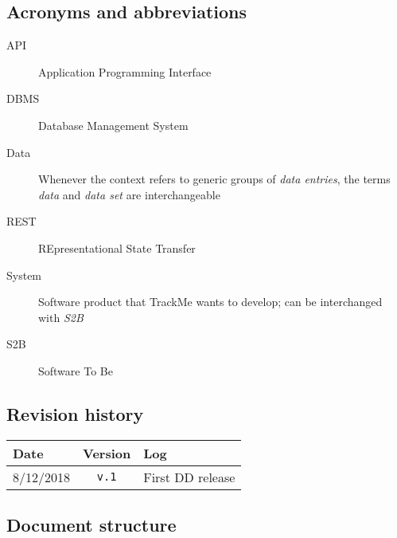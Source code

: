 \documentclass[../DD0.tex]{subfiles}
\newcommand{\addRevision}[3]{#1 & \texttt{v.#2} & #3 \\ \hline}
\begin{document}
  \subsection{Acronyms and abbreviations}
  \label{sec:acronyms}

    \begin{description}
      \item[API] Application Programming Interface

      \item[DBMS] Database Management System

      \item[Data] Whenever the context refers to generic groups of \textit{data entries}, the terms \textit{data} and \textit{data set} are interchangeable

      \item[REST] REpresentational State Transfer

      \item[System] Software product that TrackMe wants to develop; can be interchanged with \textit{S2B}

      \item[S2B] Software To Be
    \end{description}

  \subsection{Revision history}
  \label{sec:revhistory}

    \begin{table}[!h]
      \begin{tabularx}{\linewidth}{|l|c|X|}
        \hline
        \textbf{Date} & \textbf{Version}  & \textbf{Log} \\ \hline
        \addRevision{8/12/2018}{1}{First DD release}
      \end{tabularx}
    \end{table}

  \subsection{Document structure}
  \label{sec:docstructure}
\end{document}
